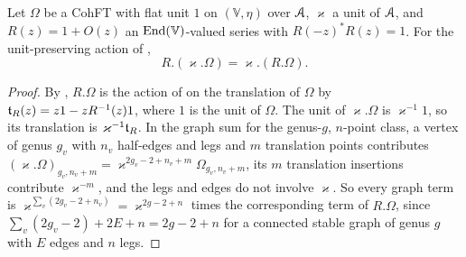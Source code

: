 \begin{lem}
\label{lem:flh-comm}
Let $\Omega$ be a CohFT with flat unit $1$ on $(\mathbb V,\eta)$ over $\mathcal{A}$, $\varkappa$ a unit of $\mathcal{A}$, and $R(z)=1+O(z)$ an $\operatorname{End}(\mathbb V)$-valued series with $R(-z)^*R(z)=1$. For the unit-preserving action of \cite[Def.~2.13]{PPZ15},
\[
R.(\varkappa.\Omega)=\varkappa.(R.\Omega).
\]
\end{lem}

\begin{proof}
By \cite[Def.~2.13]{PPZ15}, $R.\Omega$ is the action of \cite[Def.~2.2]{PPZ15} on the translation \cite[Def.~2.5]{PPZ15} of $\Omega$ by $\mathfrak{t}_R(z)=z1-zR^{-1}(z)1$, where $1$ is the unit of $\Omega$. The unit of $\varkappa.\Omega$ is $\varkappa^{-1}1$, so its translation is $\varkappa^{-1}\mathfrak{t}_R$. In the graph sum for the genus-$g$, $n$-point class, a vertex of genus $g_v$ with $n_v$ half-edges and legs and $m$ translation points contributes $(\varkappa.\Omega)_{g_v,n_v+m}=\varkappa^{2g_v-2+n_v+m}\Omega_{g_v,n_v+m}$, its $m$ translation insertions contribute $\varkappa^{-m}$, and the legs and edges do not involve $\varkappa$. So every graph term is $\varkappa^{\sum_v(2g_v-2+n_v)}=\varkappa^{2g-2+n}$ times the corresponding term of $R.\Omega$, since $\sum_v(2g_v-2)+2E+n=2g-2+n$ for a connected stable graph of genus $g$ with $E$ edges and $n$ legs.
\end{proof}


